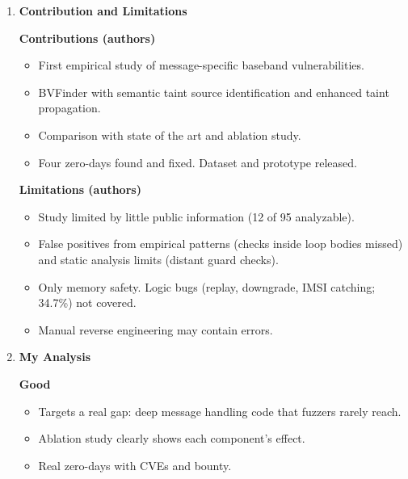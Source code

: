 \documentclass[11pt,a4paper]{article}
\newcommand{\entrypart}[1]{\textbf{\color{accent}#1}\par\vspace{2pt}}
\begin{document}
\begin{enumerate}
    \item \entrypart{Contribution and Limitations}

    \textbf{Contributions (authors)}
    \begin{itemize}
        \item First empirical study of message-specific baseband vulnerabilities.
        \item BVFinder with semantic taint source identification and enhanced taint propagation.
        \item Comparison with state of the art and ablation study.
        \item Four zero-days found and fixed. Dataset and prototype released.
    \end{itemize}

    \vspace{4pt}
    \textbf{Limitations (authors)}
    \begin{itemize}
        \item Study limited by little public information (12 of 95 analyzable).
        \item False positives from empirical patterns (checks inside loop bodies missed) and static analysis limits (distant guard checks).
        \item Only memory safety. Logic bugs (replay, downgrade, IMSI catching; 34.7\%) not covered.
        \item Manual reverse engineering may contain errors.
    \end{itemize}

    \item \entrypart{My Analysis}

    \textbf{Good}
    \begin{itemize}
        \item Targets a real gap: deep message handling code that fuzzers rarely reach.
        \item Ablation study clearly shows each component's effect.
        \item Real zero-days with CVEs and bounty.
    \end{itemize}


\end{enumerate}
\end{document}
